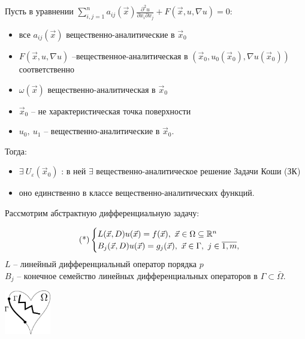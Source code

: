 \documentclass[../main.tex]{subfiles}
\begin{document}
\begin{theorem}[Ковалевской]
Пусть в уравнении $\displaystyle\sum\limits_{i,j=1}^{n} a_{ij}(\vec{x})\frac{\partial^2u}{\partial x_i\partial x_j} + F(\vec{x}, u, \nabla u) = 0$:
\begin{itemize}[nolistsep, noitemsep]
\item все $a_{ij}(\vec{x})$ вещественно-аналитические в $\vec{x}_0$ 
\item $F(\vec{x}, u, \nabla u)$ --вещественное-аналитическая в $(\vec{x}_0, u_0(\vec{x}_0), \nabla u(\vec{x}_0))$ соответственно 
\item $\omega(\vec{x})$ вещественно-аналитическая в $\vec{x}_0$
\item $\vec{x}_0$ -- не характеристическая точка поверхности
\item $u_0,\ u_1$ -- вещественно-аналитические в $\vec{x}_0$.
\end{itemize}
Тогда: 
\begin{itemize}[nolistsep, noitemsep]
\item $\exists\: U_{\varepsilon}(\vec{x}_0)$ : в ней $\exists$ вещественно-аналитическое решение Задачи Коши (ЗК)
\item оно единственно в классе вещественно-аналитических функций.
\end{itemize}
\end{theorem}


Рассмотрим абстрактную дифференциальную задачу:

\begin{equation}
\label{eq::2::diff}
\tag{*}
\begin{cases} L(\vec{x}, D)u(\vec{x}) = f(\vec{x}),\ \vec{x} \in \Omega \subseteq \R^n  \\
B_j(\vec{x},D) u(\vec{x}) = g_j(\vec{x}),\ \vec{x}\in \Gamma,\ j\in\overline{1,m},
\end{cases}
\end{equation}
$L$ -- линейный дифференциальный оператор порядка $p$\\
$B_j$ -- конечное семейство линейных дифференциальных операторов в $\Gamma \subset \bar{\Omega}$.

\begin{center}
\includegraphics[width=0.15\textwidth]{pic 2_3.pdf}
\end{center}
\end{document}
